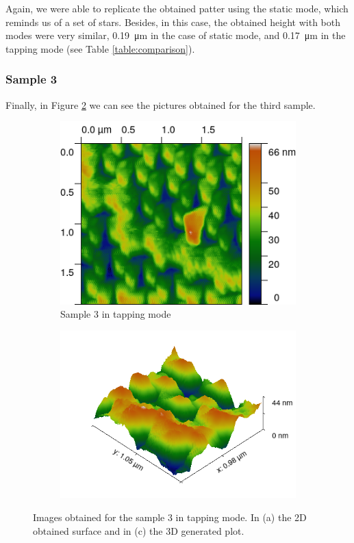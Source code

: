 \documentclass[11pt,a4paper]{article}
\begin{document}
Again, we were able to replicate the obtained patter using the static mode, which reminds us of a set of stars. Besides, in this case, the obtained height with both modes were very similar, \SI{0.19}{\micro\m} in the case of static mode, and \SI{0.17}{\micro\m} in the tapping mode (see Table \ref{table:comparison}).

\subsubsection{Sample 3}\label{sec:sample3_tapping}

Finally, in Figure \ref{fig:tapping_sample3} we can see the pictures obtained for the third sample.

\begin{figure}[H]
\centering
\begin{subfigure}[b]{0.45\textwidth}
\includegraphics[width=\textwidth]{tm_sample3}
\caption{Sample 3 in tapping mode}
\label{fig:}
\end{subfigure}
\begin{subfigure}[b]{0.45\textwidth}
\includegraphics[width=\textwidth]{tm_sample3_3D}
\caption{}
\end{subfigure}
\caption{Images obtained for the sample 3 in tapping mode. In (a) the 2D obtained surface and in (c) the 3D generated plot.}
\label{fig:tapping_sample3}
\end{figure}
\end{document}
